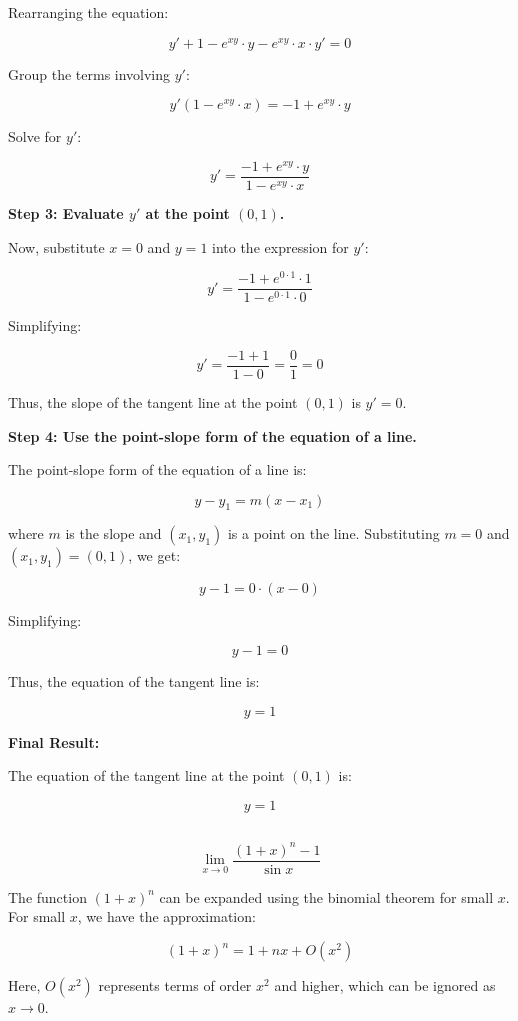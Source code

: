 \documentclass{article}
\begin{document}
Rearranging the equation:

\[
y' + 1 - e^{xy} \cdot y - e^{xy} \cdot x \cdot y' = 0
\]

Group the terms involving \(y'\):

\[
y' \left( 1 - e^{xy} \cdot x \right) = -1 + e^{xy} \cdot y
\]

Solve for \(y'\):

\[
y' = \frac{-1 + e^{xy} \cdot y}{1 - e^{xy} \cdot x}
\]

\textbf{Step 3: Evaluate \(y'\) at the point \((0, 1)\).}

Now, substitute \(x = 0\) and \(y = 1\) into the expression for \(y'\):

\[
y' = \frac{-1 + e^{0 \cdot 1} \cdot 1}{1 - e^{0 \cdot 1} \cdot 0}
\]

Simplifying:

\[
y' = \frac{-1 + 1}{1 - 0} = \frac{0}{1} = 0
\]

Thus, the slope of the tangent line at the point \((0, 1)\) is \(y' = 0\).

\textbf{Step 4: Use the point-slope form of the equation of a line.}

The point-slope form of the equation of a line is:

\[
y - y_1 = m(x - x_1)
\]

where \(m\) is the slope and \((x_1, y_1)\) is a point on the line. Substituting \(m = 0\) and \((x_1, y_1) = (0, 1)\), we get:

\[
y - 1 = 0 \cdot (x - 0)
\]

Simplifying:

\[
y - 1 = 0
\]

Thus, the equation of the tangent line is:

\[
y = 1
\]

\textbf{Final Result:}

The equation of the tangent line at the point \((0, 1)\) is:

\[
y = 1
\]
\subsection{}
	
	
	\[
	\lim_{x \to 0} \frac{(1+x)^n - 1}{\sin x}
	\]

	The function \( (1+x)^n \) can be expanded using the binomial theorem for small \( x \). For small \( x \), we have the approximation:
	
	\[
	(1+x)^n = 1 + nx + O(x^2)
	\]
	
	Here, \( O(x^2) \) represents terms of order \( x^2 \) and higher, which can be ignored as \( x \to 0 \).
	
\end{document}
